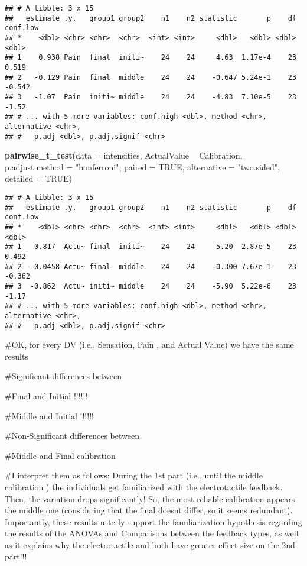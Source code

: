 \documentclass[
]{article}
\newenvironment{Shaded}{\begin{snugshade}}{\end{snugshade}}
\newcommand{\DataTypeTok}[1]{\textcolor[rgb]{0.13,0.29,0.53}{#1}}
\newcommand{\KeywordTok}[1]{\textcolor[rgb]{0.13,0.29,0.53}{\textbf{#1}}}
\newcommand{\NormalTok}[1]{#1}
\newcommand{\OperatorTok}[1]{\textcolor[rgb]{0.81,0.36,0.00}{\textbf{#1}}}
\newcommand{\OtherTok}[1]{\textcolor[rgb]{0.56,0.35,0.01}{#1}}
\newcommand{\StringTok}[1]{\textcolor[rgb]{0.31,0.60,0.02}{#1}}
\begin{document}
\begin{verbatim}
## # A tibble: 3 x 15
##   estimate .y.   group1 group2    n1    n2 statistic       p    df conf.low
## *    <dbl> <chr> <chr>  <chr>  <int> <int>     <dbl>   <dbl> <dbl>    <dbl>
## 1    0.938 Pain  final  initi~    24    24     4.63  1.17e-4    23    0.519
## 2   -0.129 Pain  final  middle    24    24    -0.647 5.24e-1    23   -0.542
## 3   -1.07  Pain  initi~ middle    24    24    -4.83  7.10e-5    23   -1.52 
## # ... with 5 more variables: conf.high <dbl>, method <chr>, alternative <chr>,
## #   p.adj <dbl>, p.adj.signif <chr>
\end{verbatim}

\begin{Shaded}
\begin{Highlighting}[]
\KeywordTok{pairwise_t_test}\NormalTok{(}\DataTypeTok{data =}\NormalTok{ intensities, ActualValue }\OperatorTok{~}\StringTok{ }\NormalTok{Calibration, }\DataTypeTok{p.adjust.method =} \StringTok{"bonferroni"}\NormalTok{, }\DataTypeTok{paired =} \OtherTok{TRUE}\NormalTok{, }\DataTypeTok{alternative =} \StringTok{"two.sided"}\NormalTok{, }\DataTypeTok{detailed =} \OtherTok{TRUE}\NormalTok{)}
\end{Highlighting}
\end{Shaded}

\begin{verbatim}
## # A tibble: 3 x 15
##   estimate .y.   group1 group2    n1    n2 statistic       p    df conf.low
## *    <dbl> <chr> <chr>  <chr>  <int> <int>     <dbl>   <dbl> <dbl>    <dbl>
## 1   0.817  Actu~ final  initi~    24    24     5.20  2.87e-5    23    0.492
## 2  -0.0458 Actu~ final  middle    24    24    -0.300 7.67e-1    23   -0.362
## 3  -0.862  Actu~ initi~ middle    24    24    -5.90  5.22e-6    23   -1.17 
## # ... with 5 more variables: conf.high <dbl>, method <chr>, alternative <chr>,
## #   p.adj <dbl>, p.adj.signif <chr>
\end{verbatim}

\#OK, for every DV (i.e., Sensation, Pain , and Actual Value) we have
the same results

\#Significant differences between

\#Final and Initial !!!!!!

\#Middle and Initial !!!!!!

\#Non-Significant differences between

\#Middle and Final calibration

\#I interpret them as follows: During the 1st part (i.e., until the
middle calibration ) the individuals get familiarized with the
electrotactile feedback. Then, the variation drops significantly! So,
the most reliable calibration appears the middle one (considering that
the final doesnt differ, so it seems redundant). Importantly, these
results utterly support the familiarization hypothesis regarding the
results of the ANOVAs and Comparisons between the feedback types, as
well as it explains why the electrotactile and both have greater effect
size on the 2nd part!!!
\end{document}
